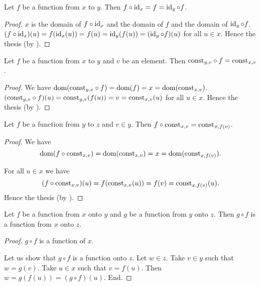 \documentclass[../../set-theory.ftl.tex]{subfiles}
\begin{document}
\begin{forthel}
    \begin{proposition}\label{SetTheory_02_01_718601}
      Let $f$ be a function from $x$ to $y$.
      Then $f \circ \operatorname{id}_{x} = f = \operatorname{id}_{y} \circ f$.
    \end{proposition}
    \begin{proof}
      $x$ is the domain of $f \circ \operatorname{id}_{x}$ and the domain of $f$ and the domain of $\operatorname{id}_{y} \circ f$.
      $(f \circ \operatorname{id}_{x})(u) = f(\operatorname{id}_{x}(u)) = f(u) = \operatorname{id}_{y}(f(u)) = (\operatorname{id}_{y} \circ f)(u)$ for all $u \in x$.
      Hence the thesis (by ).
    \end{proof}

    \begin{proposition}\label{SetTheory_02_01_558108}
      Let $f$ be a function from $x$ to $y$ and $v$ be an element.
      Then $\mbox{const}_{y,v} \circ f = \mbox{const}_{x,v}$.
    \end{proposition}
    \begin{proof}
      We have $\operatorname{dom}(\mbox{const}_{y,v} \circ f) = \operatorname{dom}(f) = x = \operatorname{dom}(\mbox{const}_{x,v})$.
      $(\mbox{const}_{y,v} \circ f)(u) = \mbox{const}_{y,v}(f(u)) = v = \mbox{const}_{x,v}(u)$ for all $u \in x$.
      Hence the thesis (by ).
    \end{proof}

    \begin{proposition}\label{SetTheory_02_01_795869}
      Let $f$ be a function from $y$ to $z$ and $v \in y$.
      Then $f \circ \mbox{const}_{x,v} = \mbox{const}_{x,f(v)}$.
    \end{proposition}
    \begin{proof}
      We have
      \[  \operatorname{dom}(f \circ \mbox{const}_{x,v})
          = \operatorname{dom}(\mbox{const}_{x,v})
          = x
          = \operatorname{dom}(\mbox{const}_{x,f(v)}). \]

      For all $u \in x$ we have
      \[  (f \circ \mbox{const}_{x,v})(u)
          = f(\mbox{const}_{x,v}(u))
          = f(v)
          = \mbox{const}_{x,f(v)}(u). \]
      Hence the thesis (by ).
    \end{proof}

    \begin{proposition}\label{SetTheory_02_01_205975}
      Let $f$ be a function from $x$ onto $y$ and $g$ be a function from $y$ onto $z$.
      Then $g \circ f$ is a function from $x$ onto $z$.
    \end{proposition}
    \begin{proof}
      $g \circ f$ is a function of $x$.

      Let us show that $g \circ f$ is a function onto $z$.
        Let $w \in z$.
        Take $v \in y$ such that $w = g(v)$.
        Take $u \in x$ such that $v = f(u)$.
        Then $w = g(f(u)) = (g \circ f)(u)$.
      End.
    \end{proof}


\end{forthel}
\end{document}
